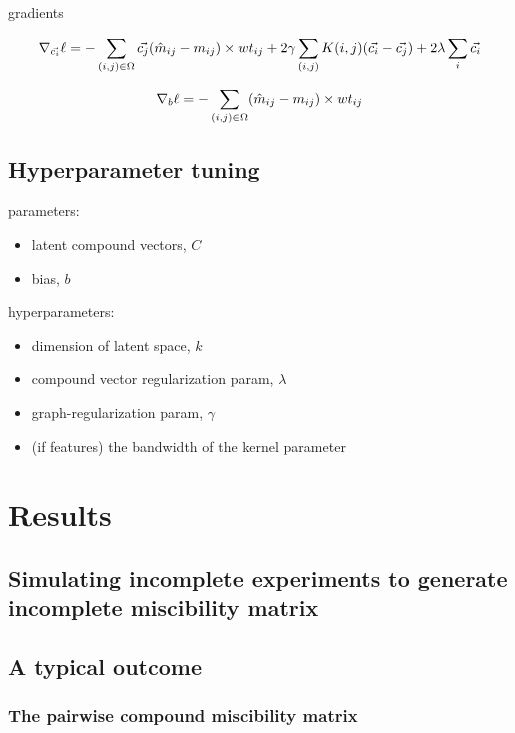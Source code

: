 \documentclass[11pt, oneside]{article}
\begin{document}
gradients

\begin{equation*}
     \nabla_{\vec{c_i}}\ell = -\sum_{(i,j) \in \Omega} \vec{c_j} (\hat{m}_{ij} -m_{ij}) \times wt_{ij} +  2\gamma \sum_{(i,j)} K(i,j)( \vec{c_i} - \vec{c_j}) + 2\lambda \sum_{i} \vec{c_i} \\
\end{equation*}

\begin{equation*}
     \nabla_b\ell = -\sum_{(i,j) \in \Omega}  (\hat{m}_{ij} -m_{ij}) \times wt_{ij}  \\
\end{equation*}


\subsection{Hyperparameter tuning}
parameters: 
\begin{itemize}	
	\item latent compound vectors, $C$
	\item bias, $b$
\end{itemize}
hyperparameters:
\begin{itemize}	
	\item dimension of latent space, $k$ 
	\item compound vector regularization param, $\lambda$
	\item graph-regularization param, $\gamma$
	\item (if features) the bandwidth of the kernel parameter
\end{itemize}


\section{Results}

\subsection{Simulating incomplete experiments to generate incomplete miscibility matrix}

\subsection{A typical outcome}
\subsubsection{The pairwise compound miscibility matrix}
\end{document}
